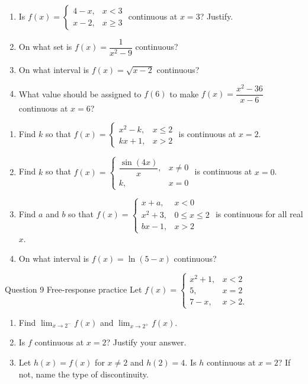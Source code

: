 \documentclass[11pt]{article}
\begin{document}
\newpage
{}

\begin{enumerate}[leftmargin=*,itemsep=2pt]
  \item Is $f(x)=\begin{cases}4-x,&x<3\\x-2,&x\ge3\end{cases}$ continuous at $x=3$? Justify.\work{2.3cm}
  \item On what set is $f(x)=\dfrac{1}{x^2-9}$ continuous?\work{2.3cm}
  \item On what interval is $f(x)=\sqrt{x-2}$ continuous?\work{2.3cm}
  \item What value should be assigned to $f(6)$ to make $f(x)=\dfrac{x^2-36}{x-6}$ continuous at $x=6$?\work{2.3cm}
\end{enumerate}

\begin{enumerate}[leftmargin=*,itemsep=2pt,start=5]
  \item Find $k$ so that $f(x)=\begin{cases}x^2-k,&x\le2\\kx+1,&x>2\end{cases}$ is continuous at $x=2$.\work{2.8cm}
  \item Find $k$ so that $f(x)=\begin{cases}\dfrac{\sin(4x)}{x},&x\neq0\\k,&x=0\end{cases}$ is continuous at $x=0$.\work{2.8cm}
  \item Find $a$ and $b$ so that $f(x)=\begin{cases}x+a,&x<0\\x^2+3,&0\le x\le2\\bx-1,&x>2\end{cases}$ is continuous for all real $x$.\work{2.8cm}
  \item On what interval is $f(x)=\ln(5-x)$ continuous?\work{2.8cm}
\end{enumerate}

\begin{frbox}{Question 9 \textperiodcentered{} Free-response practice}
Let $f(x)=\begin{cases}x^2+1,&x<2\\5,&x=2\\7-x,&x>2.\end{cases}$
\begin{enumerate}[label=(\alph*),leftmargin=*,itemsep=2pt]
  \item Find $\displaystyle\lim_{x\to 2^-}f(x)$ and $\displaystyle\lim_{x\to 2^+}f(x)$.\work{2.6cm}
  \item Is $f$ continuous at $x=2$? Justify your answer.\work{2.6cm}
  \item Let $h(x)=f(x)$ for $x\neq2$ and $h(2)=4$. Is $h$ continuous at $x=2$? If not, name the type of discontinuity.\work{2.6cm}
\end{enumerate}
\end{frbox}
\end{document}
